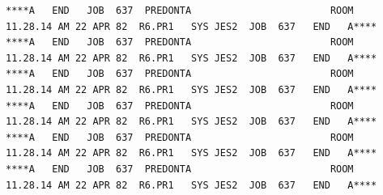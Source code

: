 {\fontsize{4.1pt}{4.8pt}\selectfont
\begin{verbatim}
****A   END   JOB  637  PREDONTA                        ROOM       11.28.14 AM 22 APR 82  R6.PR1   SYS JES2  JOB  637   END   A****
****A   END   JOB  637  PREDONTA                        ROOM       11.28.14 AM 22 APR 82  R6.PR1   SYS JES2  JOB  637   END   A****
****A   END   JOB  637  PREDONTA                        ROOM       11.28.14 AM 22 APR 82  R6.PR1   SYS JES2  JOB  637   END   A****
****A   END   JOB  637  PREDONTA                        ROOM       11.28.14 AM 22 APR 82  R6.PR1   SYS JES2  JOB  637   END   A****
****A   END   JOB  637  PREDONTA                        ROOM       11.28.14 AM 22 APR 82  R6.PR1   SYS JES2  JOB  637   END   A****
****A   END   JOB  637  PREDONTA                        ROOM       11.28.14 AM 22 APR 82  R6.PR1   SYS JES2  JOB  637   END   A****
\end{verbatim}
}
